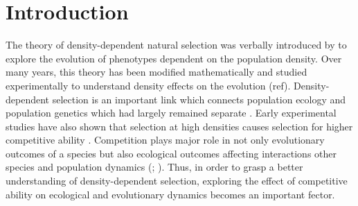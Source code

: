 \chapter{Introduction}
The theory of density-dependent natural selection was verbally introduced by \textcite{macarthurTheoryIslandBiogeography1967} to explore the evolution of phenotypes dependent on the population density. Over many years, this theory has been modified mathematically and studied experimentally to understand density effects on the evolution (ref). Density-dependent selection is an important link which connects population ecology and population genetics which had largely remained separate \parencite{muellerTheoreticalEmpiricalExamination1997}. Early experimental studies have also shown that selection at high densities causes selection for higher competitive ability \parencite{joshiKselectionAselectionEffectiveness2001}. Competition plays major role in not only evolutionary outcomes of a species but also ecological outcomes affecting interactions other species and population dynamics (\cite{caseIllustratedGuideTheoretical2000a}; \cite{deyAdaptationLarvalCrowding2012}). Thus, in order to grasp a better understanding of density-dependent selection, exploring the effect of competitive ability on ecological and evolutionary dynamics becomes an important fector.   
\pagebreak
